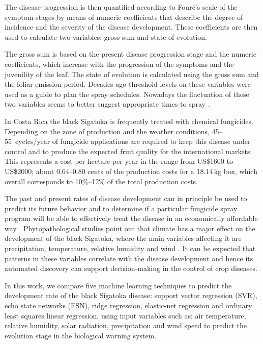 The disease progression is then quantified according to Fouré's scale
of the symptom stages \citep{foure1988} by means of numeric
coefficients that describe the degree of incidence and the severity of
the disease development.  These coefficients are then used to
calculate two variables: gross sum and state of evolution.

The gross sum is based on the present disease progression stage and
the numeric coefficients, which increase with the progression of
the symptoms and the juvenility of the leaf.
%
The state of evolution is calculated using the gross sum and the
foliar emission period.
%
Decades ago threshold levels on these variables were used as a guide
to plan the spray schedules.  Nowadays the fluctuation of these two
variables seems to better suggest appropriate times to spray
\citep{Marinetal2003}.

In Costa Rica the black Sigatoka is frequently treated with
chemical fungicides.
%
Depending on the zone of production and the weather conditions,
45--55~cycles/year of fungicide applications are required to keep this
disease under control and to produce the expected fruit quality for the
international markets.
%
This represents a cost per hectare per year in the range from US\$1600
to US\$2000; about 0.64--0.80 cents of the production costs for a
18.14\,kg box, which overall corresponds to 10\%--12\% of the total
production costs.

The past and present rates of disease development can in principle be
used to predict its future behavior and to determine if a particular
fungicide spray program will be able to effectively treat the disease
in an economically affordable way \citep{ChuangJeger1987}.
%
Phytopathological studies point out that climate has a major effect on
the development of the black Sigatoka, where the main variables
affecting it are precipitation, temperature, relative humidity and
wind \citep{MarinVargas1995}.  It can be expected that patterns in
these variables correlate with the disease development and hence its
automated discovery can support decision-making in the control of crop
diseases.

In this work, we compare five machine learning techniques to predict
the development rate of the black Sigatoka disease: support vector
regression (SVR), echo state networks (ESN), ridge regression,
elastic-net regression and ordinary least squares linear regression,
using input variables such as: air temperature, relative humidity, solar radiation, precipitation and wind speed  to predict the evolution stage in the biological warning system.

